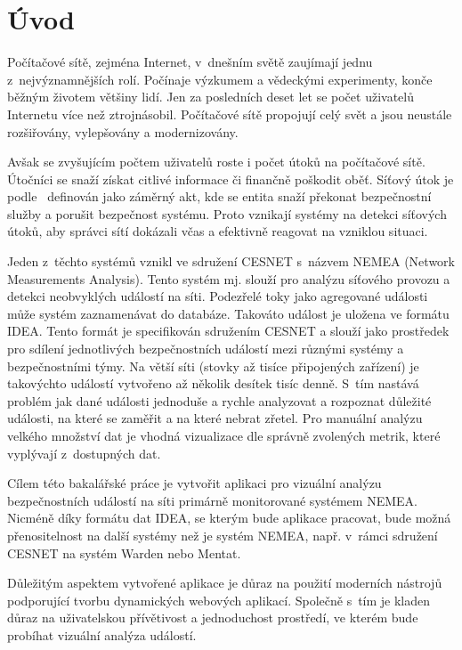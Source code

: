 
\newcommand\note[1]{{\Large \textcolor{red}{#1}}}

\chapter{Úvod}
Počítačové sítě, zejména Internet, v~dnešním světě zaujímají jednu z~nejvýznamnějších rolí. Počínaje výzkumem a vědeckými experimenty, konče běžným životem většiny lidí. Jen za posledních deset let se počet uživatelů Internetu více než ztrojnásobil. Počítačové sítě propojují celý svět a jsou neustále rozšiřovány, vylepšovány a modernizovány.

Avšak se zvyšujícím počtem uživatelů roste i počet útoků na počítačové sítě. Útočníci se snaží získat citlivé informace či finančně poškodit oběť. Síťový útok je podle~\cite{rfc:attack} definován jako záměrný akt, kde se entita snaží překonat bezpečnostní služby a porušit bezpečnost systému. Proto vznikají systémy na detekci síťových útoků, aby správci sítí dokázali včas a efektivně reagovat na vzniklou situaci. 

Jeden z~těchto systémů vznikl ve sdružení CESNET s~názvem NEMEA (Network Measurements Analysis). Tento systém mj. slouží pro analýzu síťového provozu a detekci neobvyklých událostí na síti. Podezřelé toky jako agregované události může systém zaznamenávat do databáze. Takováto událost je uložena ve formátu IDEA. Tento formát je specifikován sdružením CESNET a slouží jako prostředek pro sdílení jednotlivých bezpečnostních událostí mezi různými systémy a bezpečnostními týmy. Na větší síti (stovky až tisíce připojených zařízení) je takovýchto událostí vytvořeno až několik desítek tisíc denně. S~tím nastává problém jak dané události jednoduše a rychle analyzovat a rozpoznat důležité události, na které se zaměřit a na které nebrat zřetel. Pro manuální analýzu velkého množství dat je vhodná vizualizace dle správně zvolených metrik, které vyplývají z~dostupných dat.

Cílem této bakalářské práce je vytvořit aplikaci pro vizuální analýzu bezpečnostních událostí na síti primárně monitorované systémem NEMEA. Nicméně díky formátu dat IDEA, se kterým bude aplikace pracovat, bude možná přenositelnost na další systémy než je systém NEMEA, např. v~rámci sdružení CESNET na systém Warden nebo Mentat.

Důležitým aspektem vytvořené aplikace je důraz na použití moderních nástrojů podporující tvorbu dynamických webových aplikací. Společně s~tím je kladen důraz na uživatelskou přívětivost a jednoduchost prostředí, ve kterém bude probíhat vizuální analýza událostí.


